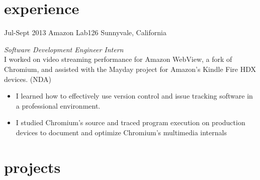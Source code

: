 \documentclass[]{mills-cv} %
\begin{document}

\section{experience}

\begin{entrylist}
\entry
{Jul-Sept 2013}
{Amazon Lab126}
{Sunnyvale, California}
{\emph{Software Development Engineer Intern} \\
I worked on video streaming performance for Amazon WebView, a fork of Chromium, and assisted with the Mayday project for Amazon's Kindle Fire HDX devices. (NDA)
\begin{itemize}
\item I learned how to effectively use version control and issue tracking software in a professional environment.
\item I studied Chromium's source and traced program execution on production devices to document and optimize Chromium's multimedia internals
\end{itemize}}
\end{entrylist}

\section{projects}
\end{document}
